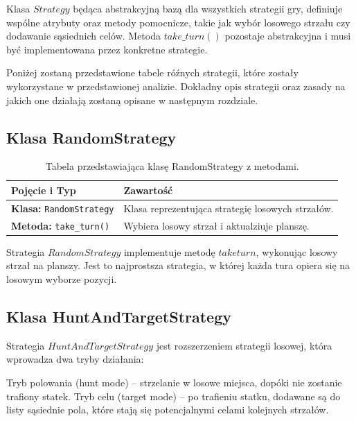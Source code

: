 \documentclass[magisterska]{pracadypl}
\begin{document}
{Klasa $Strategy$ będąca abstrakcyjną bazą dla wszystkich strategii gry, definiuje wspólne atrybuty oraz metody pomocnicze, takie jak wybór losowego strzału czy dodawanie sąsiednich celów. Metoda $take\_turn()$ pozostaje abstrakcyjna i musi być implementowana przez konkretne strategie.

Poniżej zostaną przedstawione tabele róźnych strategii, które zostały wykorzystane w przedstawionej analizie. Dokładny opis strategii oraz zasady na jakich one działają zostaną opisane w następnym rozdziale.
\subsection{Klasa RandomStrategy}
\begin{table}[H]
\centering
\begin{tabularx}{\textwidth}{|p{6cm}|X|}
\hline
\textbf{Pojęcie i Typ} & \textbf{Zawartość} \\ \hline
\textbf{Klasa:} \texttt{RandomStrategy} & Klasa reprezentująca strategię losowych strzałów. \\ \hline
\textbf{Metoda:} \texttt{take\_turn()} & Wybiera losowy strzał i aktualziuje planszę. \\ \hline
\end{tabularx}
\caption{Tabela przedstawiająca klasę RandomStrategy z metodami.}
\end{table}


Strategia $RandomStrategy$ implementuje metodę $take turn$, wykonując losowy strzał na planszy. Jest to najprostsza strategia, w której każda tura opiera się na losowym wyborze pozycji.
\subsection{Klasa HuntAndTargetStrategy}
Strategia $HuntAndTargetStrategy$ jest rozszerzeniem strategii losowej, która wprowadza dwa tryby działania:

Tryb polowania (hunt mode) – strzelanie w losowe miejsca, dopóki nie zostanie trafiony statek.
Tryb celu (target mode) – po trafieniu statku, dodawane są do listy sąsiednie pola, które stają się potencjalnymi celami kolejnych strzałów.
}
\end{document}
